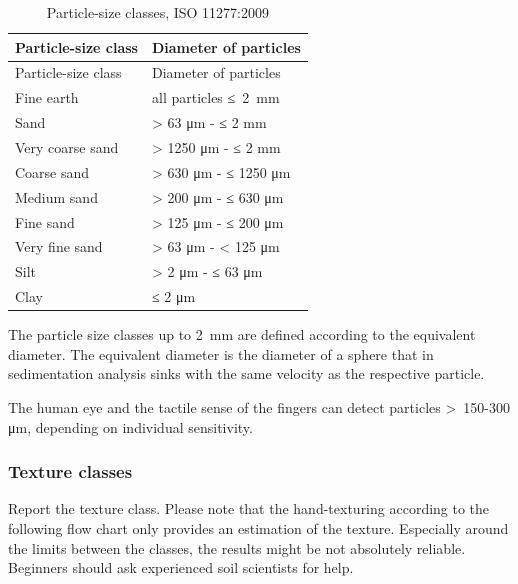 \documentclass[
  letterpaper,
  DIV=11,
  numbers=noendperiod]{scrreprt}
\begin{document}
\begin{longtable}[]{@{}ll@{}}
\caption{Particle-size classes, ISO 11277:2009}\tabularnewline
\toprule()
Particle-size class & Diameter of particles \\
\midrule()
\endfirsthead
\toprule()
Particle-size class & Diameter of particles \\
\midrule()
\endhead
Fine earth & all particles ≤~2~mm \\
Sand & \textgreater{} 63 μm - ≤ 2 mm \\
Very coarse sand & \textgreater{} 1250 μm - ≤ 2 mm \\
Coarse sand & \textgreater{} 630 μm - ≤ 1250 μm \\
Medium sand & \textgreater{} 200 μm - ≤ 630 μm \\
Fine sand & \textgreater{} 125 μm - ≤ 200 μm \\
Very fine sand & \textgreater{} 63 μm - \textless{} 125 μm \\
Silt & \textgreater{} 2 μm - ≤ 63 μm \\
Clay & ≤ 2 μm \\
\bottomrule()
\end{longtable}

The particle size classes up to 2~mm are defined according to the
equivalent diameter. The equivalent diameter is the diameter of a sphere
that in sedimentation analysis sinks with the same velocity as the
respective particle.

The human eye and the tactile sense of the fingers can detect particles
\textgreater~150-300 μm, depending on individual sensitivity.

\hypertarget{texture-classes}{%
\subsubsection{Texture classes}\label{texture-classes}}

Report the texture class. Please note that the hand-texturing according
to the following flow chart only provides an estimation of the texture.
Especially around the limits between the classes, the results might be
not absolutely reliable. Beginners should ask experienced soil
scientists for help.
\end{document}
